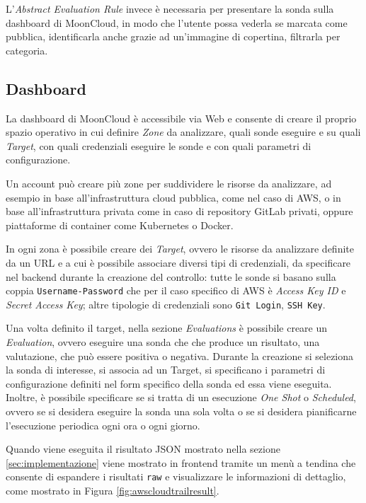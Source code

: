 L'\textit{Abstract Evaluation Rule} invece è necessaria per presentare la sonda sulla dashboard di MoonCloud, in modo che l'utente possa vederla se marcata come pubblica, identificarla anche grazie ad un'immagine di copertina, filtrarla per categoria. 

\subsection{Dashboard}
\label{sec:dashboard}

La dashboard di MoonCloud è accessibile via Web e consente di creare il proprio spazio operativo in cui definire \textit{Zone} da analizzare, quali sonde eseguire e su quali \textit{Target}, con quali credenziali eseguire le sonde e con quali parametri di configurazione.

Un account può creare più zone per suddividere le risorse da analizzare, ad esempio in base all'infrastruttura cloud pubblica, come nel caso di AWS, o in base all'infrastruttura privata come in caso di repository GitLab privati, oppure piattaforme di container come Kubernetes o Docker.  

In ogni zona è possibile creare dei \textit{Target}, ovvero le risorse da analizzare definite da un URL e a cui è possibile associare diversi tipi di credenziali, da specificare nel backend durante la creazione del controllo: tutte le sonde si basano sulla coppia \texttt{Username-Password} che per il caso specifico di AWS è \textit{Access Key ID} e \textit{Secret Access Key}; altre tipologie di credenziali sono \texttt{Git Login}, \texttt{SSH Key}. 

Una volta definito il target, nella sezione \textit{Evaluations} è possibile creare un \textit{Evaluation}, ovvero eseguire una sonda che che produce un risultato, una valutazione, che può essere positiva o negativa. Durante la creazione si seleziona la sonda di interesse, si associa ad un Target, si specificano i parametri di configurazione definiti nel form specifico della sonda ed essa viene eseguita. Inoltre, è possibile specificare se si tratta di un esecuzione \textit{One Shot} o \textit{Scheduled}, ovvero se si desidera eseguire la sonda una sola volta o se si desidera pianificarne l'esecuzione periodica ogni ora o ogni giorno.

Quando viene eseguita il risultato JSON mostrato nella sezione \ref{sec:implementazione} viene mostrato in frontend tramite un menù a tendina che consente di espandere i risultati \texttt{raw} e visualizzare le informazioni di dettaglio, come mostrato in Figura \ref{fig:awscloudtrailresult}.


